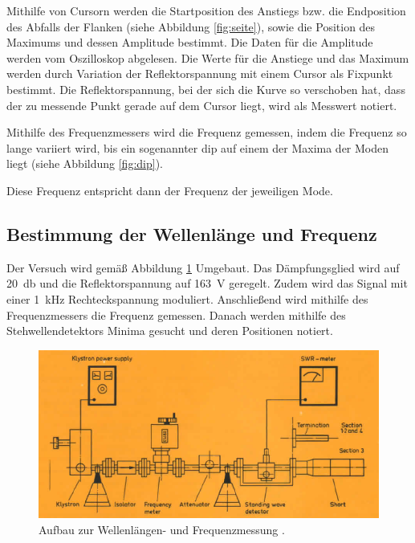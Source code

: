Mithilfe von Cursorn werden die Startposition des Anstiegs bzw. die Endposition
des Abfalls der Flanken (siehe Abbildung \ref{fig:seite}), sowie die Position des
Maximums und dessen Amplitude bestimmt. Die Daten für die Amplitude werden vom
Oszilloskop abgelesen. Die Werte für die Anstiege und das Maximum werden durch
Variation der Reflektorspannung mit einem Cursor als Fixpunkt bestimmt. Die Reflektorspannung,
bei der sich die Kurve so verschoben hat, dass der zu messende Punkt gerade auf dem
Cursor liegt, wird als Messwert notiert.


Mithilfe des Frequenzmessers
wird die Frequenz gemessen, indem die Frequenz so lange variiert wird, bis ein
sogenannter dip auf einem der Maxima der Moden liegt (siehe Abbildung \ref{fig:dip}).


Diese Frequenz entspricht dann der Frequenz der jeweiligen Mode.

\subsection{Bestimmung der Wellenlänge und Frequenz}
\label{subsec:frequenz}
Der Versuch wird gemäß Abbildung \ref{fig:aufbau_frequenz} Umgebaut. Das Dämpfungsglied
wird auf \SI{20}{\decibel} und die Reflektorspannung auf \SI{163}{\volt} geregelt. Zudem wird das
Signal mit einer \SI{1}{\kilo\hertz} Rechteckspannung moduliert. Anschließend wird
mithilfe des Frequenzmessers die Frequenz gemessen. Danach werden mithilfe des
Stehwellendetektors Minima gesucht und deren Positionen notiert.

\begin{figure}
  \centering
  \includegraphics[width=\textwidth]{data/aufbau_frequenz.png}
  \caption{Aufbau zur Wellenlängen- und Frequenzmessung \cite{Versuchsanleitung_alt}.}
  \label{fig:aufbau_frequenz}
\end{figure}

